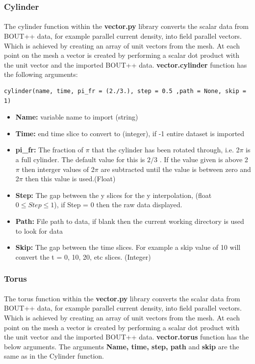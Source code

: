 \documentclass[12pt,a4paper]{article}
\begin{document}
\subsubsection{Cylinder}
\paragraph{}
The cylinder function within the \textbf{vector.py} library converts the scalar data from BOUT++ data, for example parallel current density, into field parallel vectors. Which is achieved by creating an array of unit vectors from the mesh. At each point on the mesh a vector is created by performing a scalar dot product with the unit vector and the imported BOUT++ data. \textbf{vector.cylinder} function has the following arguments:

\begin{verbatim}
cylinder(name, time, pi_fr = (2./3.), step = 0.5 ,path = None, skip = 1)
\end{verbatim}

\begin{itemize}
	\item{\textbf{Name:} variable name to import (string)}
	\item{\textbf{Time:} end time slice to convert to (integer), if -1 entire dataset is imported}
	\item{\textbf{pi\_fr:} The fraction of $\pi$ that the cylinder has been rotated through, i.e. 2$\pi$ is a full cylinder. The default value for this is $2/3$ . If the value given is above 2$\pi$ then interger values of 2$\pi$ are subtracted until the value is between zero and 2$\pi$ then this value is used.(Float)}
	\item{\textbf{Step:} The gap between the y slices for the y interpolation, (float  $ 0 \leq Step \leq 1$), if Step = 0 then  the raw data displayed.}
	\item{\textbf{Path:} File path to data, if blank then the current working directory is used to look for data}
	\item{\textbf{Skip:} The gap between the time slices. For example a skip value of 10 will convert the t = 0, 10, 20, etc slices. (Integer)}
\end{itemize}

\subsubsection{Torus}
\paragraph{}
The torus function within the \textbf{vector.py} library converts the scalar data from BOUT++ data, for example parallel current density, into field parallel vectors. Which is achieved by creating an array of unit vectors from the mesh. At each point on the mesh a vector is created by performing a scalar dot product with the unit vector and the imported BOUT++ data. \textbf{vector.torus} function has the below arguments. The arguments \textbf{Name, time, step, path} and \textbf{skip} are the same as in the Cylinder function.
\end{document}
